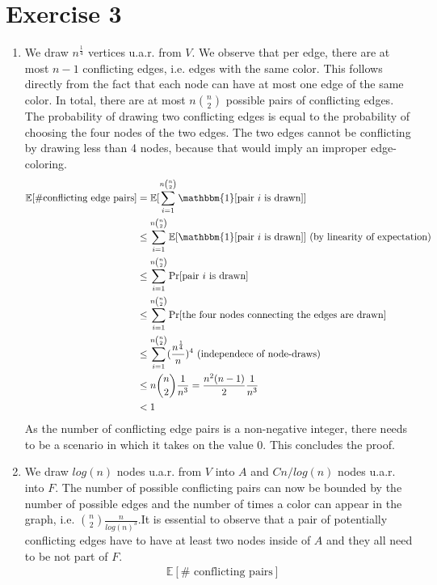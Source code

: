 \documentclass[a4paper,german]{article}
\begin{document}
\section*{Exercise 3}
\begin{enumerate}
\item
We draw \(n^\frac{1}{4}\) vertices u.a.r. from \(V\). We observe that per edge, there are at most \(n-1\) conflicting edges, i.e. edges with the same color. This follows directly from the fact that each node can have at most one edge of the same color.  In total, there are at most \( n{{n}\choose{2}} \) possible pairs of conflicting edges. The probability of drawing two conflicting edges is equal to the probability of choosing the four nodes of the two edges. The two edges cannot be conflicting by drawing less than 4 nodes, because that would imply an improper edge-coloring.
\begin{align*}
\mathbb{E}[\#\text{conflicting edge pairs}] &= \mathbb{E}[\sum_{i=1}^{n{{n}\choose{2}}} \mathbbm{1} [\text{pair } i \text{ is drawn}]]\\
&\leq \sum_{i=1}^{n{{n}\choose{2}}}  \mathbb{E} [\mathbbm{1} [\text{pair } i \text{ is drawn}]] \text{ (by linearity of expectation)} \\
& \leq  \sum_{i=1}^{n{{n}\choose{2}}}  \Pr [\text{pair } i \text{ is drawn}] \\
& \leq  \sum_{i=1}^{n{{n}\choose{2}}}  \Pr [\text{the four nodes connecting the edges are drawn}] \\
&\leq \sum_{i=1}^{n{{n}\choose{2}}}  (\frac{n^\frac{1}{4}}{n})^4 \text{ (independece of node-draws)}\\
& \leq n{{n}\choose{2}} \frac{1}{n^3} = \frac{n^2(n-1)}{2} \frac{1}{n^3} \\
& < 1
\end{align*} 
As the number of conflicting edge pairs is a non-negative integer, there needs to be a scenario in which it takes on the value 0. This concludes the proof.
\item
We draw \(log(n)\) nodes u.a.r. from \(V\) into \(A\) and \(Cn/log(n)\) nodes u.a.r. into \(F\). The number of possible conflicting pairs can now be bounded by the number of possible edges and the number of times a color can appear in the graph, i.e. \( {{n} \choose {2}} \frac{n}{log(n)^3}\).It is essential to observe that a pair of potentially conflicting edges have to have at least two nodes inside of \(A\) and they all need to be not part of \(F\). 
\begin{align*}
&\mathbb{E}[\#\text{ conflicting pairs}] \\

\end{align*}
\end{enumerate}
\end{document}
